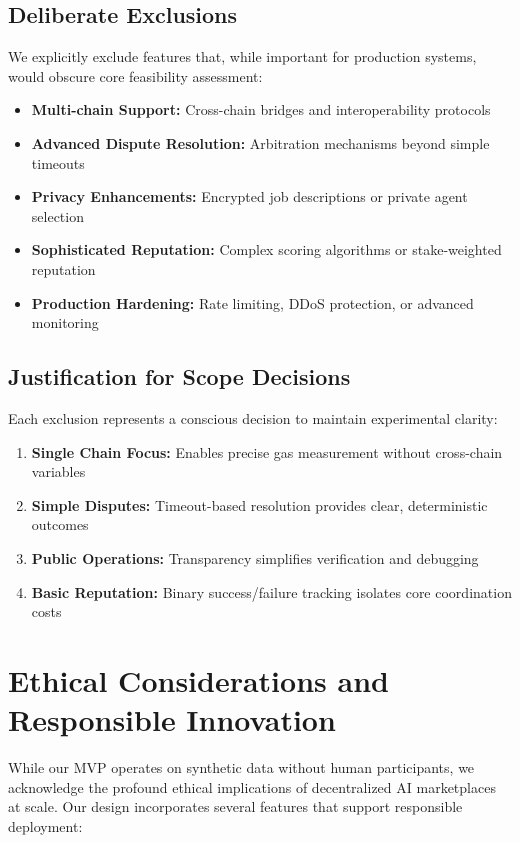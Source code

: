 \subsection{Deliberate Exclusions}

We explicitly exclude features that, while important for production systems, would obscure core feasibility assessment:
\begin{itemize}
    \item \textbf{Multi-chain Support:} Cross-chain bridges and interoperability protocols
    \item \textbf{Advanced Dispute Resolution:} Arbitration mechanisms beyond simple timeouts
    \item \textbf{Privacy Enhancements:} Encrypted job descriptions or private agent selection
    \item \textbf{Sophisticated Reputation:} Complex scoring algorithms or stake-weighted reputation
    \item \textbf{Production Hardening:} Rate limiting, DDoS protection, or advanced monitoring
\end{itemize}

\subsection{Justification for Scope Decisions}

Each exclusion represents a conscious decision to maintain experimental clarity:
\begin{enumerate}
    \item \textbf{Single Chain Focus:} Enables precise gas measurement without cross-chain variables
    \item \textbf{Simple Disputes:} Timeout-based resolution provides clear, deterministic outcomes
    \item \textbf{Public Operations:} Transparency simplifies verification and debugging
    \item \textbf{Basic Reputation:} Binary success/failure tracking isolates core coordination costs
\end{enumerate}

\section{Ethical Considerations and Responsible Innovation}

While our MVP operates on synthetic data without human participants, we acknowledge the profound ethical implications of decentralized AI marketplaces at scale. Our design incorporates several features that support responsible deployment:

